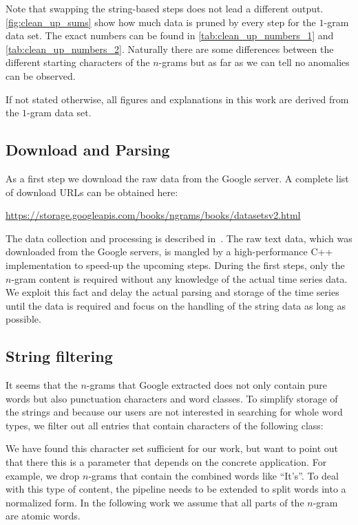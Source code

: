 Note that swapping the string-based steps does not lead a different output. \autoref{fig:clean_up_sums} show how much data is pruned by every step for the $1$-gram data set. The exact numbers can be found in \autoref{tab:clean_up_numbers_1} and \autoref{tab:clean_up_numbers_2}. Naturally there are some differences between the different starting characters of the $n$-grams but as far as we can tell no anomalies can be observed.

If not stated otherwise, all figures and explanations in this work are derived from the $1$-gram data set.


\subsection{Download and Parsing}
\label{ssec:baseline:data:download}
As a first step we download the raw data from the Google server. A complete list of download URLs can be obtained here:

\url{https://storage.googleapis.com/books/ngrams/books/datasetsv2.html}

The data collection and processing is described in~\cite{Google_nGrams}. The raw text data, which was downloaded from the Google servers, is mangled by a high-performance C++ implementation to speed-up the upcoming steps. During the first steps, only the $n$-gram content is required without any knowledge of the actual time series data. We exploit this fact and delay the actual parsing and storage of the time series until the data is required and focus on the handling of the string data as long as possible.


\subsection{String filtering}
\label{ssec:baseline:data:filter}
It seems that the $n$-grams that Google extracted does not only contain pure words but also punctuation characters and word classes. To simplify storage of the strings and because our users are not interested in searching for whole word types, we filter out all entries that contain characters of the following class:

\code{\[\_.\slash{},:;!?\textbackslash'"\#()<>=+*\{\}0-9\]}

We have found this character set sufficient for our work, but want to point out that there this is a parameter that depends on the concrete application. For example, we drop $n$-grams that contain the combined words like \enquote{It's}. To deal with this type of content, the pipeline needs to be extended to split words into a normalized form. In the following work we assume that all parts of the $n$-gram are atomic words.

